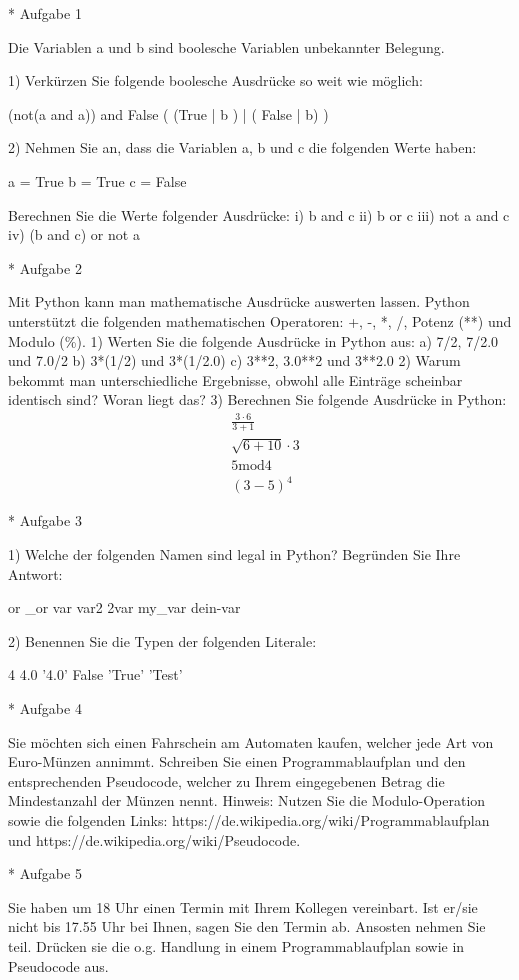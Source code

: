* Aufgabe 1

Die Variablen a und b sind boolesche Variablen unbekannter Belegung. 

1) Verkürzen Sie folgende boolesche Ausdrücke so weit wie möglich: 

 (not(a and a)) and False
 ( (True | b ) | ( False | b) )
 
2) Nehmen Sie an, dass die Variablen a, b und c die folgenden Werte haben: 
 
 a = True
 b = True
 c = False
 
Berechnen Sie die Werte folgender Ausdrücke:
i) b and c
ii) b or c
iii) not a and c
iv) (b and c) or not a

* Aufgabe 2

Mit Python kann man mathematische Ausdrücke auswerten lassen. Python unterstützt die folgenden mathematischen Operatoren: +, -, *, /, Potenz (**) und Modulo (\%).   
1) Werten Sie die folgende Ausdrücke in Python aus: 
a) 7/2, 7/2.0 und 7.0/2
b) 3*(1/2) und 3*(1/2.0)
c) 3**2, 3.0**2 und 3**2.0
2) Warum bekommt man unterschiedliche Ergebnisse, obwohl alle Einträge scheinbar identisch sind? Woran liegt das?
3) Berechnen Sie folgende Ausdrücke in Python: 
\begin{align}
&\frac{3 \cdot 6}{3 + 1}\\
&\sqrt{6+10} \cdot 3 \\
&5 \text{mod} 4 \\
&(3-5)^4
\end{align}

* Aufgabe 3

1) Welche der folgenden Namen sind legal in Python? Begründen Sie Ihre Antwort: 

or
_or
var
var2
2var
my_var
dein-var

2) Benennen Sie die Typen der folgenden Literale:

4
4.0
'4.0'
False
'True'
'Test'


* Aufgabe 4

Sie möchten sich einen Fahrschein am Automaten kaufen, welcher jede Art von Euro-Münzen annimmt. Schreiben Sie einen Programmablaufplan und den entsprechenden Pseudocode, welcher zu Ihrem eingegebenen Betrag die Mindestanzahl der Münzen nennt. 
Hinweis: Nutzen Sie die Modulo-Operation sowie die folgenden Links: https://de.wikipedia.org/wiki/Programmablaufplan und https://de.wikipedia.org/wiki/Pseudocode.

* Aufgabe 5

Sie haben um 18 Uhr einen Termin mit Ihrem Kollegen vereinbart. Ist er/sie nicht bis 17.55 Uhr bei Ihnen, sagen Sie den Termin ab. Ansosten nehmen Sie teil. Drücken sie die o.g. Handlung in einem Programmablaufplan sowie in Pseudocode aus.
